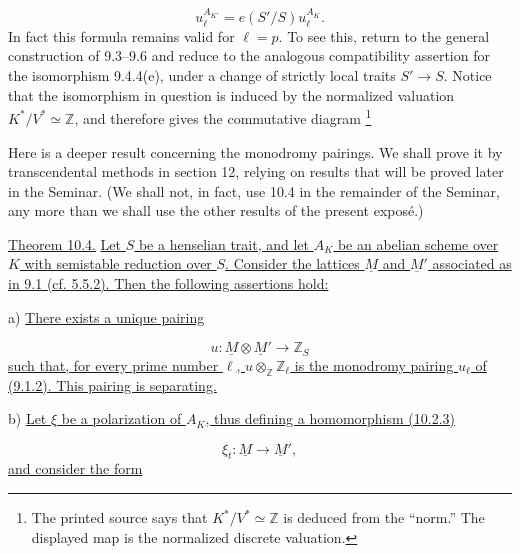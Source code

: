 \begin{equation}\tag{10.3.5}
u_\ell^{A_{K'}}=e(S'/S)u_\ell^{A_K}.
\end{equation}
In fact this formula remains valid for $\ell=p$. To see this, return to
the general construction of 9.3--9.6 and reduce to the analogous
compatibility assertion for the isomorphism 9.4.4(e), under a change of
strictly local traits $S'\longrightarrow S$. Notice that the isomorphism
in question is induced by the normalized valuation
$K^*/V^*\simeq\mathbb Z$, and therefore gives the commutative diagram
\footnote{The printed source says that $K^*/V^*\simeq\mathbb Z$ is
deduced from the ``norm.''  The displayed map is the normalized discrete
valuation.}

\begin{center}
\end{center}

Here is a deeper result concerning the monodromy pairings. We shall prove
it by transcendental methods in section 12, relying on results that will
be proved later in the Seminar. (We shall not, in fact, use 10.4 in the
remainder of the Seminar, any more than we shall use the other results of
the present expos\'e.)

\medskip
\noindent
\underline{Theorem 10.4.} \underline{Let $S$ be a henselian trait, and
let $A_K$ be an abelian scheme over $K$ with semistable reduction over
$S$. Consider the lattices $\underline M$ and $\underline M'$ associated
as in 9.1 (cf. 5.5.2). Then the following assertions hold:}

\smallskip
\noindent
a) \underline{There exists a unique pairing}

\begin{equation}\tag{10.4.1}
u:\underline M\otimes\underline M'\longrightarrow\mathbb Z_S
\end{equation}
\underline{such that, for every prime number $\ell$,
$u\otimes_{\mathbb Z}\mathbb Z_\ell$ is the monodromy pairing $u_\ell$
of (9.1.2). This pairing is separating.}

\smallskip
\noindent
b) \underline{Let $\xi$ be a polarization of $A_K$, thus defining a
homomorphism (10.2.3)}

\begin{equation*}
\xi_t:\underline M\longrightarrow\underline M',
\end{equation*}
\underline{and consider the form}

